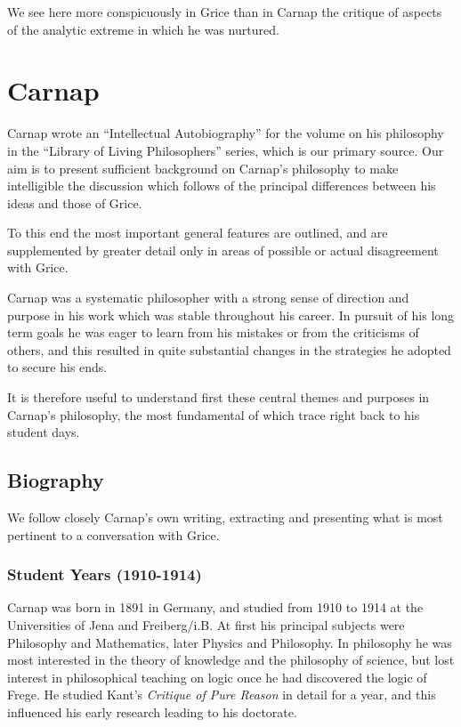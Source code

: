 \documentclass[10pt,titlepage]{book}
\begin{document}
We see here more conspicuously in Grice than in Carnap the critique of aspects of the analytic extreme in which he was nurtured.


\chapter{Carnap}

Carnap wrote an ``Intellectual Autobiography''\cite{carnap63} for the volume on his philosophy\cite{carnap63a} in the ``Library of Living Philosophers'' series, which is our primary source.
Our aim is to present sufficient background on Carnap's philosophy to make intelligible the discussion which follows of the principal differences between his ideas and those of Grice.

To this end the most important general features are outlined, and are supplemented by greater detail only in areas of possible or actual disagreement with Grice.

Carnap was a systematic philosopher with a strong sense of direction and purpose in his work which was stable throughout his career.
In pursuit of his long term goals he was eager to learn from his mistakes or from the criticisms of others, and this resulted in quite substantial changes in the strategies he adopted to secure his ends.

It is therefore useful to understand first these central themes and purposes in Carnap's philosophy, the most fundamental of which trace right back to his student days.

\section{Biography}

We follow closely Carnap's own writing, extracting and presenting what is most pertinent to a conversation with Grice.

\subsection{Student Years (1910-1914)}

Carnap was born in 1891 in Germany, and studied from 1910 to 1914 at the Universities of Jena and Freiberg/i.B.
At first his principal subjects were Philosophy and Mathematics, later Physics and Philosophy.
In philosophy he was most interested in the theory of knowledge and the philosophy of science, but lost interest in philosophical teaching on logic once he had discovered the logic of Frege.
He studied Kant's \emph{Critique of Pure Reason} in detail for a year, and this influenced his early research leading to his doctorate.
\end{document}
